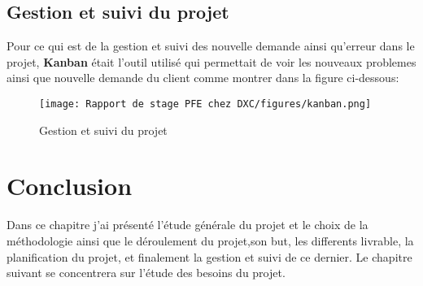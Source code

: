 \subsection{Gestion et suivi du projet}
Pour ce qui est de la gestion et suivi des nouvelle demande ainsi qu'erreur dans le projet, \textbf{Kanban} était l'outil utilisé qui permettait de voir les nouveaux problemes ainsi que nouvelle demande du client comme montrer dans la figure ci-dessous:

\begin{figure}[!h]
    \centering
    \texttt{[image: Rapport de stage PFE chez DXC/figures/kanban.png]}
    \caption{Gestion et suivi du projet}
\end{figure}


\section{Conclusion}

Dans ce chapitre j’ai présenté l’étude générale du projet et le choix de la méthodologie ainsi
que le déroulement du projet,son but, les differents livrable, la planification du projet, et finalement la gestion et suivi de ce dernier. Le chapitre suivant se concentrera sur l’étude des besoins du projet.
